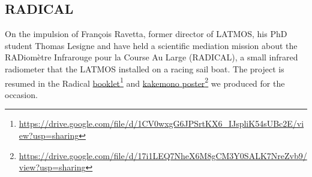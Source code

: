     \subsection*{RADICAL}
    On the impulsion of François Ravetta, former director of LATMOS, his PhD student Thomas Lesigne and have held a scientific mediation mission about the RADiomètre Infrarouge pour la Course Au Large (RADICAL), a small infrared radiometer that the LATMOS installed on a racing sail boat. The project is resumed in the Radical \href{https://drive.google.com/file/d/1CV0wxgG6JPSrtKX6_IJspliK54sUBc2E/view?usp=sharing}{booklet}\footnote{\url{https://drive.google.com/file/d/1CV0wxgG6JPSrtKX6_IJspliK54sUBc2E/view?usp=sharing}} and \href{https://drive.google.com/file/d/17i1LEQ7NheX6M8gCM3Y0SALK7NreZvb9/view?usp=sharing}{kakemono poster}\footnote{\url{https://drive.google.com/file/d/17i1LEQ7NheX6M8gCM3Y0SALK7NreZvb9/view?usp=sharing}} we produced for the occasion. 








